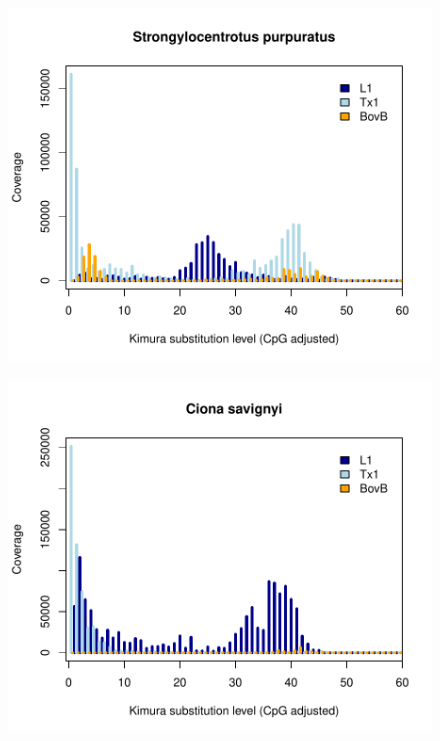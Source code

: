 \documentclass[12pt,a4paper,times]{article}
\begin{document}
\begin{figure}[H]
	\centering
	\includegraphics[scale=0.8]{suppFigures/divergencePlots/Strongylocentrotus_purpuratus.pdf}
	\caption{\label{Strongylocentrotus_purpuratus}}
\end{figure}

\begin{figure}[H]
	\centering
	\includegraphics[scale=0.8]{suppFigures/divergencePlots/Ciona_savignyi.pdf}
	\caption{\label{Ciona_savignyi}}
\end{figure}
\end{document}
